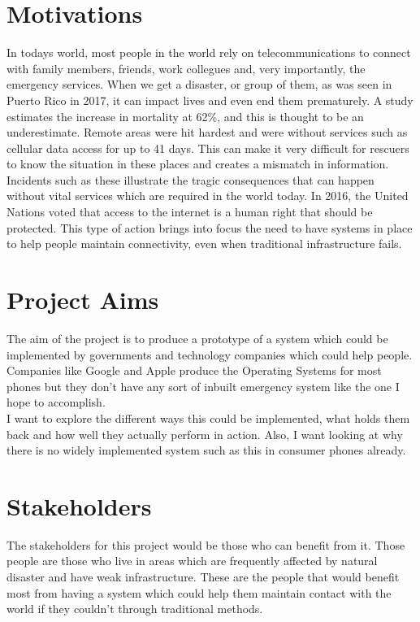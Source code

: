 \documentclass{report}
\begin{document}
\section*{Motivations}
In todays world, most people in the world rely on telecommunications to connect with family members, friends, 
work collegues and, very importantly, the emergency services. When we get a disaster, or group of them, as was 
seen in Puerto Rico in 2017, it can impact lives and even end them prematurely. A study estimates the increase in 
mortality at 62\%\cite{kishore2018mortality}, and this is thought to be an underestimate. Remote areas were hit hardest and were without services 
such as cellular data access for up to 41 days. This can make it very difficult for rescuers to know the situation in 
these places and creates a mismatch in information.
\bigskip\\
Incidents such as these illustrate the tragic consequences that can happen without vital services which are required in the 
world today. In 2016, the United Nations voted that access to the internet is a human right that should be protected\cite{UNResolutionJune2016}. 
This type of action brings into focus the need to have systems in place to help people maintain connectivity, even when traditional infrastructure 
fails. 

\section*{Project Aims}

The aim of the project is to produce a prototype of a system which could be implemented by governments and technology 
companies which could help people. Companies like Google and Apple produce the Operating Systems for most phones but 
they don't have any sort of inbuilt emergency system like the one I hope to accomplish. 
\bigskip\\
I want to explore the different ways this could be implemented, what holds them back and how well they actually perform 
in action. Also, I want looking at why there is no widely implemented system such as this in consumer phones already. 

\section*{Stakeholders}

The stakeholders for this project would be those who can benefit from it. Those people are those who live in areas 
which are frequently affected by natural disaster and have weak infrastructure. These are the people that would benefit 
most from having a system which could help them maintain contact with the world if they couldn't through traditional 
methods.
\end{document}
